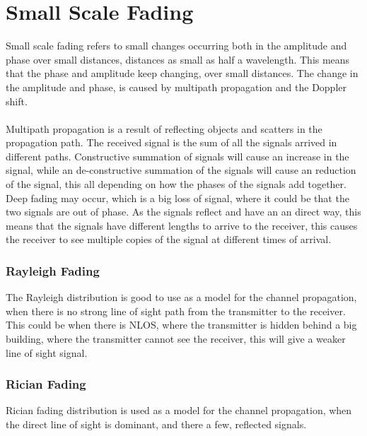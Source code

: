 \chapter{Small Scale Fading}

Small scale fading refers to small changes occurring both in the amplitude and phase over small distances, distances as small as half a wavelength. This means that the phase and amplitude keep changing, over small distances. The change in the amplitude and phase, is caused by multipath propagation and the Doppler shift.  
\\
\\
Multipath propagation is a result of reflecting objects and scatters in the propagation path.  
The received signal is the sum of all the signals arrived in different paths. Constructive summation of signals will cause an increase in the signal, while an de-constructive summation of the signals will cause an reduction of the signal, this all depending on how the phases of the signals add together. Deep fading may occur, which is a big loss of signal, where it could be that the two signals are out of phase. As the signals reflect and have an an direct way, this means that the signals have different lengths to arrive to the receiver, this causes the receiver to see multiple copies of the signal at different times of arrival.  


\subsection{Rayleigh Fading}
The Rayleigh distribution is good to use as a model for the channel propagation, when there is no strong line of sight path from the transmitter to the receiver. This could be when there is NLOS, where the transmitter is hidden behind a big building, where the transmitter cannot see the receiver, this will give a weaker line of sight signal.

\subsection{Rician Fading}
Rician fading distribution is used as a model for the channel propagation, when the direct line of sight is dominant, and there a few, reflected signals. 





